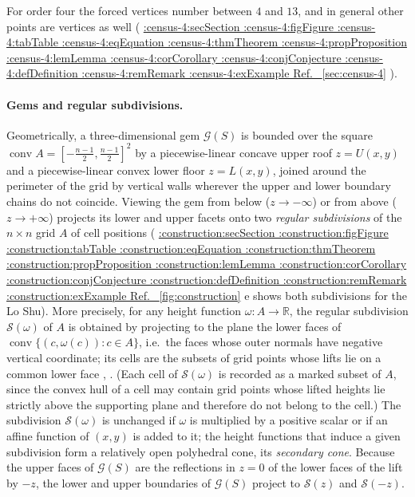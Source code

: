 \documentclass[11pt,a4paper]{article}
\makeatletter
\def\Cref@getprefix#1:#2\relax{#1}
\def\Cref@prefix@sec{sec}
\def\Cref@prefix@fig{fig}
\def\Cref@prefix@tab{tab}
\def\Cref@prefix@eq{eq}
\def\Cref@prefix@thm{thm}
\def\Cref@prefix@prop{prop}
\def\Cref@prefix@lem{lem}
\def\Cref@prefix@cor{cor}
\def\Cref@prefix@conj{conj}
\def\Cref@prefix@def{def}
\def\Cref@prefix@rem{rem}
\def\Cref@prefix@ex{ex}
\def\Cref@type@cap#1{%
  \edef\Cref@tmp{#1}%
  \ifx\Cref@tmp\Cref@prefix@sec Section%
  \else\ifx\Cref@tmp\Cref@prefix@fig Figure%
  \else\ifx\Cref@tmp\Cref@prefix@tab Table%
  \else\ifx\Cref@tmp\Cref@prefix@eq Equation%
  \else\ifx\Cref@tmp\Cref@prefix@thm Theorem%
  \else\ifx\Cref@tmp\Cref@prefix@prop Proposition%
  \else\ifx\Cref@tmp\Cref@prefix@lem Lemma%
  \else\ifx\Cref@tmp\Cref@prefix@cor Corollary%
  \else\ifx\Cref@tmp\Cref@prefix@conj Conjecture%
  \else\ifx\Cref@tmp\Cref@prefix@def Definition%
  \else\ifx\Cref@tmp\Cref@prefix@rem Remark%
  \else\ifx\Cref@tmp\Cref@prefix@ex Example%
  \else Ref.%
  \fi\fi\fi\fi\fi\fi\fi\fi\fi\fi\fi\fi
}
\DeclareRobustCommand{\Cref}[1]{%
  \begingroup
  \edef\Cref@label{#1}%
  \edef\Cref@prefix{\expandafter\Cref@getprefix\Cref@label:\relax}%
  \hyperref[#1]{\Cref@type@cap{\Cref@prefix}~\ref*{#1}}%
  \endgroup
}
\theoremstyle{plain}
\theoremstyle{definition}
\theoremstyle{remark}
\newcommand{\R}{\mathbb{R}}
\makeatother
\begin{document}
For order four the forced vertices number between $4$ and $13$, and in general other points are vertices as well (\Cref{sec:census-4}).

\paragraph{Gems and regular subdivisions.}
\label{sec:subdivisions}
Geometrically, a three-dimensional gem $\mathcal G(S)$ is bounded over the square $\operatorname{conv}A=[-\frac{n-1}2,\frac{n-1}2]^2$ by a piecewise-linear concave upper roof $z=U(x,y)$ and a piecewise-linear convex lower floor $z=L(x,y)$, joined around the perimeter of the grid by vertical walls wherever the upper and lower boundary chains do not coincide.
Viewing the gem from below ($z\to-\infty$) or from above ($z\to+\infty$) projects its lower and upper facets onto two \emph{regular subdivisions} of the $n\times n$ grid $A$ of cell positions (\Cref{fig:construction}e shows both subdivisions for the Lo Shu).
More precisely, for any height function $\omega\colon A\to\R$, the regular subdivision $\mathcal S(\omega)$ of $A$ is obtained by projecting to the plane the lower faces of $\operatorname{conv}\{(c,\omega(c)):c\in A\}$, i.e.\ the faces whose outer normals have negative vertical coordinate; its cells are the subsets of grid points whose lifts lie on a common lower face \cite[Ch.~2]{deloera2010triangulations}, \cite[Ch.~7]{gelfand1994discriminants}.
(Each cell of $\mathcal S(\omega)$ is recorded as a marked subset of $A$, since the convex hull of a cell may contain grid points whose lifted heights lie strictly above the supporting plane and therefore do not belong to the cell.)
The subdivision $\mathcal S(\omega)$ is unchanged if $\omega$ is multiplied by a positive scalar or if an affine function of $(x,y)$ is added to it; the height functions that induce a given subdivision form a relatively open polyhedral cone, its \emph{secondary cone}.
Because the upper faces of $\mathcal G(S)$ are the reflections in $z=0$ of the lower faces of the lift by $-z$, the lower and upper boundaries of $\mathcal G(S)$ project to $\mathcal S(z)$ and $\mathcal S(-z)$.
\end{document}
